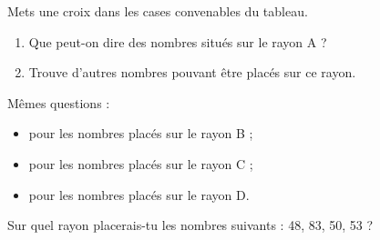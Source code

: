 \par{}
\begin{myenumerate}
  \item Mets une croix dans les cases convenables du tableau.
  \item
    \begin{enumerate}
    \item Que peut-on dire des nombres situés sur le rayon A ?
    \item Trouve d'autres nombres pouvant être placés sur ce rayon.
    \end{enumerate}
  \item Mêmes questions :
    \begin{itemize}
      \item pour les nombres placés sur le rayon B ;
      \item pour les nombres placés sur le rayon C ;
      \item pour les nombres placés sur le rayon D.
    \end{itemize}
  \item Sur quel rayon placerais-tu les nombres suivants : 48, 83, 50, 53 ?
\end{myenumerate}
